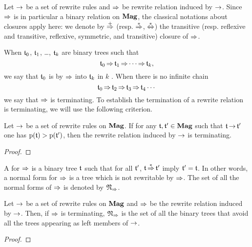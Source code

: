 Let $\operatorname{\to}$ be a set of rewrite rules and $\operatorname{\Rightarrow}$ be rewrite
relation induced by $\operatorname{\to}$. Since $\operatorname{\Rightarrow}$ is in particular a
binary relation on $\mathbf{Mag}$, the classical notations about closures apply
here: we denote by $\operatorname{\overset{+}{\operatorname{\Rightarrow}}}$ (resp. $\operatorname{\overset{\ast}{\operatorname{\Rightarrow}}}$,
$\operatorname{\overset{\ast}{\Leftrightarrow}}$) the transitive (resp. reflexive and transitive,
reflexive, symmetric, and transitive) closure of $\operatorname{\Rightarrow}$.
\medbreak

When $\mathfrak{t}_0$, $\mathfrak{t}_1$, \dots, $\mathfrak{t}_k$ are binary trees such that
\begin{equation}
    \mathfrak{t}_0 \operatorname{\Rightarrow} \mathfrak{t}_1 \operatorname{\Rightarrow} \cdots \operatorname{\Rightarrow} \mathfrak{t}_k,
\end{equation}
we say that $\mathfrak{t}_0$ is  by $\operatorname{\Rightarrow}$ into $\mathfrak{t}_k$
in $k$ . When there is no infinite chain
\begin{equation} \label{equ:infinite_chain}
    \mathfrak{t}_0 \operatorname{\Rightarrow} \mathfrak{t}_2 \operatorname{\Rightarrow} \mathfrak{t}_3 \operatorname{\Rightarrow} \mathfrak{t}_4
    \cdots
\end{equation}
we say that $\operatorname{\Rightarrow}$ is terminating. To establish the termination
of a rewrite relation is terminating, we will use the following
criterion.
\medbreak

\begin{Lemma}\label{lem:prefix_word_termination}
    Let $\operatorname{\to}$ be a set of rewrite rules on $\mathbf{Mag}$. If for any
    $\mathfrak{t}, \mathfrak{t}' \in \mathbf{Mag}$ such that $\mathfrak{t} \operatorname{\to} \mathfrak{t}'$ one has
    $\mathrm{p}(\mathfrak{t}) > \mathrm{p}(\mathfrak{t}')$, then the rewrite relation
    induced by $\operatorname{\to}$ is terminating.
\end{Lemma}
\begin{proof}
\end{proof}
\medbreak

A  for $\operatorname{\Rightarrow}$ is a binary tree $\mathfrak{t}$ such
that for all $\mathfrak{t}'$, $\mathfrak{t} \operatorname{\overset{\ast}{\operatorname{\Rightarrow}}} \mathfrak{t}'$ imply $\mathfrak{t}' = \mathfrak{t}$.
In other words, a normal form for $\operatorname{\Rightarrow}$ is a tree which is not
rewritable by $\operatorname{\Rightarrow}$. The set of all the normal forms of
$\operatorname{\Rightarrow}$ is denoted by $\mathfrak{N}_{\operatorname{\Rightarrow}}$.
\medbreak

\begin{Lemma} \label{lem:normal_forms_avoiding}
    Let $\operatorname{\to}$ be a set of rewrite rules on $\mathbf{Mag}$ and $\operatorname{\Rightarrow}$ be
    the rewrite relation induced by $\operatorname{\to}$. Then, if $\operatorname{\Rightarrow}$ is
    terminating, $\mathfrak{N}_{\operatorname{\Rightarrow}}$ is the set of all the
    binary trees that avoid all the trees appearing as left members
    of $\operatorname{\to}$.
\end{Lemma}
\begin{proof}
\end{proof}
\medbreak

